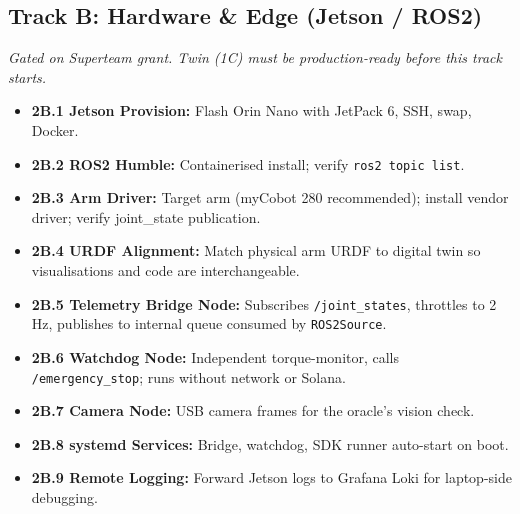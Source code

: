 \documentclass[11pt, a4paper]{article}
\begin{document}
\subsection*{Track B: Hardware \& Edge (Jetson / ROS2)}
\textit{Gated on Superteam grant. Twin (1C) must be production-ready before this track starts.}
\begin{itemize}
    \item \textbf{2B.1 Jetson Provision:} Flash Orin Nano with JetPack 6, SSH, swap, Docker.
    \item \textbf{2B.2 ROS2 Humble:} Containerised install; verify \texttt{ros2 topic list}.
    \item \textbf{2B.3 Arm Driver:} Target arm (myCobot 280 recommended); install vendor driver; verify joint\_state publication.
    \item \textbf{2B.4 URDF Alignment:} Match physical arm URDF to digital twin so visualisations and code are interchangeable.
    \item \textbf{2B.5 Telemetry Bridge Node:} Subscribes \texttt{/joint\_states}, throttles to 2\,Hz, publishes to internal queue consumed by \texttt{ROS2Source}.
    \item \textbf{2B.6 Watchdog Node:} Independent torque-monitor, calls \texttt{/emergency\_stop}; runs without network or Solana.
    \item \textbf{2B.7 Camera Node:} USB camera frames for the oracle's vision check.
    \item \textbf{2B.8 systemd Services:} Bridge, watchdog, SDK runner auto-start on boot.
    \item \textbf{2B.9 Remote Logging:} Forward Jetson logs to Grafana Loki for laptop-side debugging.
\end{itemize}
\end{document}
